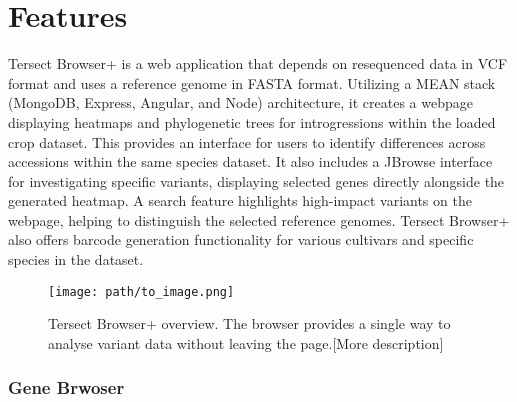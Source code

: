 \documentclass[unnumsec,webpdf,contemporary,large]{oup-authoring-template}%
\theoremstyle{thmstyleone}%
\theoremstyle{thmstyletwo}%
\theoremstyle{thmstylethree}%
\begin{document}

\section{Features}
Tersect Browser+ is a web application that depends on resequenced data in VCF format and uses a reference genome in FASTA format. Utilizing a MEAN stack (MongoDB, Express, Angular, and Node) architecture, it creates a webpage displaying heatmaps and phylogenetic trees for introgressions within the loaded crop dataset. This provides an interface for users to identify differences across accessions within the same species dataset. It also includes a JBrowse interface for investigating specific variants, displaying selected genes directly alongside the generated heatmap. A search feature highlights high-impact variants on the webpage, helping to distinguish the selected reference genomes. Tersect Browser+ also offers barcode generation functionality for various cultivars and specific species in the dataset.

\begin{figure} [http]
  \centering
  \texttt{[image: path/to\_image.png]}
  \caption{Tersect Browser+ overview. The browser provides a single way to analyse variant data without leaving the page.[More description]}
  \label{fig:your_label}
\end{figure}

\subsubsection{Gene Brwoser}
\end{document}
